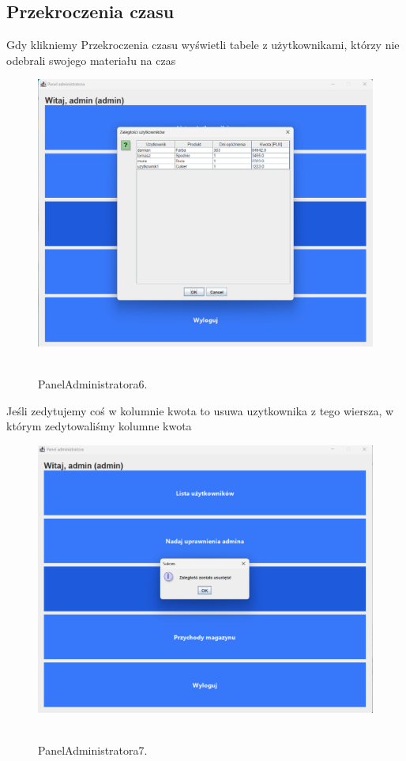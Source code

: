 \subsection{Przekroczenia czasu}
\label{subsec:Przekroczenia czasu}
Gdy klikniemy Przekroczenia czasu wyświetli tabele z użytkownikami, którzy nie odebrali swojego materiału na czas
\begin{figure}[H]
    \centering
    \includegraphics[width=.7\linewidth]{figures/PanelAdministratora6.png}\
    \caption{PanelAdministratora6.\label{PanelAdministratora6}}
\end{figure}
Jeśli zedytujemy coś w kolumnie kwota to usuwa uzytkownika z tego wiersza, w którym zedytowaliśmy kolumne kwota
\begin{figure}[H]
    \centering
    \includegraphics[width=.7\linewidth]{figures/PanelAdministratora7.png}\
    \caption{PanelAdministratora7.\label{PanelAdministratora7}}
\end{figure}
\clearpage
